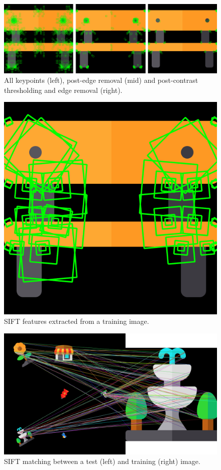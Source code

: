 \documentclass[11pt]{article}
\begin{document}
\begin{multicols}{2}
\setlength\abovedisplayskip{0pt}
\setlength\belowdisplayskip{0pt}
\begin{figure}[H]
\centering
\includegraphics[width=0.9\linewidth]{img/EDGECONTRAST.png} 
\caption{All keypoints (left), post-edge removal (mid) and post-contrast thresholding and edge removal (right).}\label{fig:EDGECONTRAST}
\end{figure}
\vspace*{-\baselineskip}

\setlength\abovedisplayskip{0pt}
\setlength\belowdisplayskip{0pt}
\begin{figure}[H]
\centering
\includegraphics[width=0.35\linewidth]{img/BenchSIFTFeatures.png} 
\caption{SIFT features extracted from a training image.}\label{fig:BenchSIFTFeatures}
\end{figure}
\vspace*{-\baselineskip}

\setlength\abovedisplayskip{0pt}
\setlength\belowdisplayskip{0pt}
\begin{figure}[H]
\centering
\includegraphics[width=0.65\linewidth]{img/SIFTMATCHES.png} 
\caption{SIFT matching between a test (left) and training (right) image.}\label{fig:SIFTMATCHES}
\end{figure}
\vspace*{-\baselineskip}


\end{multicols}
\end{document}
